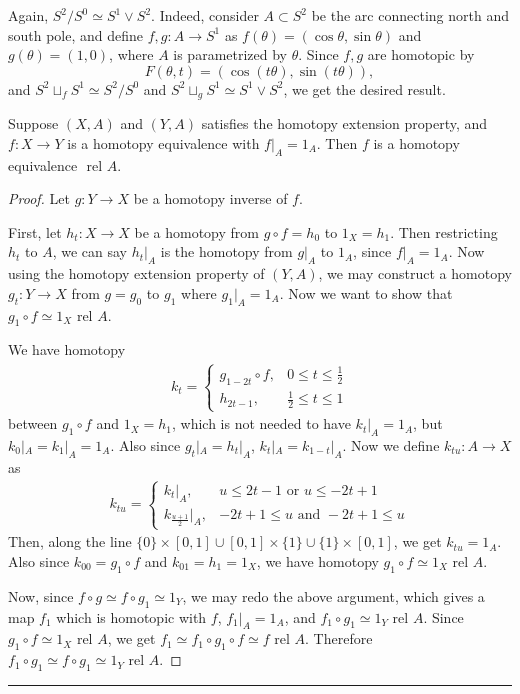 \begin{exmp} Again, $S^2/S^0\simeq S^1\vee S^2$. Indeed, consider $A\subset S^2$ be the arc connecting north and south pole, and define $f,g:A\rightarrow S^1$ as $f(\theta)=(\cos \theta, \sin\theta)$ and $g(\theta)=(1,0)$, where $A$ is parametrized by $\theta$. Since $f,g$ are homotopic by
\begin{equation}
F(\theta,t)=(\cos (t\theta),\sin(t\theta)),
\end{equation}
and $S^2\sqcup_f S^1\simeq S^2/S^0$ and $S^2\sqcup_g S^1\simeq S^1\vee S^2$, we get the desired result.
\end{exmp}

\begin{prop} Suppose $(X,A)$ and $(Y,A)$ satisfies the homotopy extension property, and $f:X\rightarrow Y$ is a homotopy equivalence with $f|_A=1_A$. Then $f$ is a homotopy equivalence $\textrm{ rel }A$.
\end{prop}
\begin{proof}
Let $g:Y\rightarrow X$ be a homotopy inverse of $f$.

First, let $h_t:X\rightarrow X$ be a homotopy from $g\circ f=h_0$ to $1_X=h_1$. Then restricting $h_t$ to $A$, we can say $h_t|_A$ is the homotopy from $g|_A$ to $1_A$, since $f|_A=1_A$. Now using the homotopy extension property of $(Y,A)$, we may construct a homotopy $g_t:Y\rightarrow X$ from $g=g_0$ to $g_1$ where $g_1|_A=1_A$. Now we want to show that $g_1\circ f\simeq 1_X \textrm{ rel } A$.

We have homotopy
\begin{align*}
k_t=\begin{cases}
g_{1-2t}\circ f,&0\leq t\leq \frac{1}{2}\\
h_{2t-1},&\frac{1}{2}\leq t \leq 1
\end{cases}
\end{align*}
between $g_1\circ f$ and $1_X=h_1$, which is not needed to have $k_t|_A=1_A$, but $k_0|_A=k_1|_A=1_A$. Also since $g_t|_A=h_t|_A$, $k_t|_A=k_{1-t}|_A$. Now we define $k_{tu}:A\rightarrow X$ as
\begin{align*}
k_{tu}=\begin{cases}
k_{t}|_A, & u\leq 2t-1 \textrm{ or } u\leq -2t+1\\
k_{\frac{u+1}{2}}|_A, & -2t+1\leq u \textrm{ and } -2t+1\leq u
\end{cases}
\end{align*}
Then, along the line $\{0\}\times [0,1]\cup [0,1]\times \{1\}\cup \{1\}\times [0,1]$, we get $k_{tu}=1_A$. Also since $k_{00}=g_1\circ f$ and $k_{01}=h_1=1_X$, we have homotopy $g_1\circ f \simeq 1_X \textrm{ rel } A$.

Now, since $f\circ g\simeq f\circ g_1\simeq 1_Y$, we may redo the above argument, which gives a map $f_1$ which is homotopic with $f$, $f_1|_A=1_A$, and $f_1\circ g_1\simeq 1_Y \textrm{ rel } A$. Since $g_1\circ f\simeq 1_X \textrm{ rel }A$, we get $f_1\simeq f_1\circ g_1\circ f \simeq f \textrm{ rel }A$. Therefore $f_1\circ g_1\simeq f\circ g_1\simeq 1_Y \textrm{ rel }A$.
\end{proof}

\noindent\rule{\textwidth}{1pt}
\newline